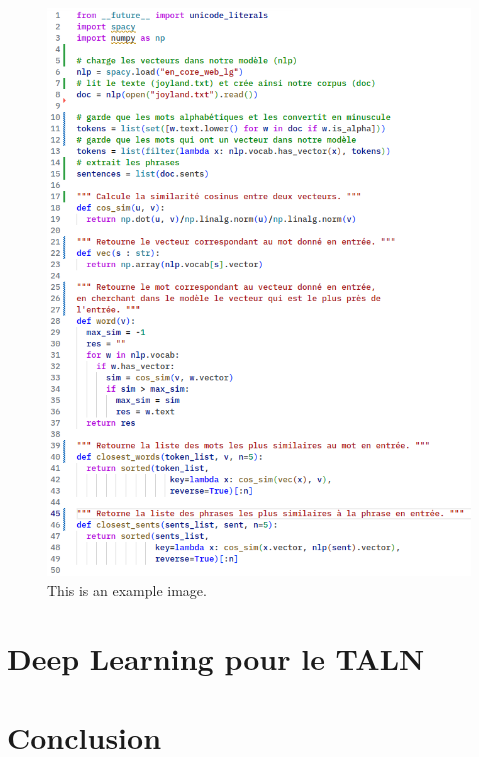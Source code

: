 \documentclass[11pt, a4paper]{report}
\begin{document}
\begin{figure}[h]
  \centering
  \includegraphics[width=1\textwidth]{code1.png}
  \caption{This is an example image.}
  \label{fig:example}
\end{figure}


\chapter{Deep Learning pour le TALN}
\chapter{Conclusion}



\end{document}
